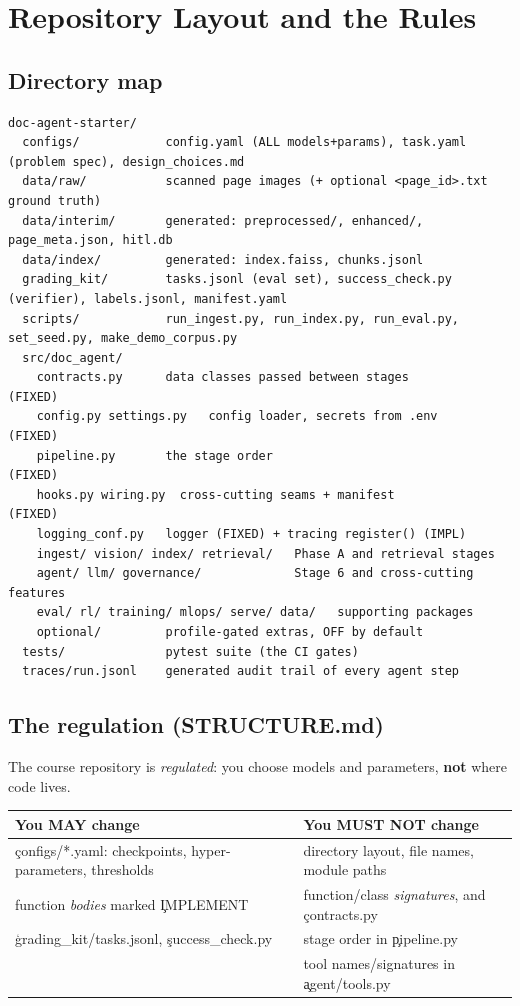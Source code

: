 \chapter{Repository Layout and the Rules}
\section{Directory map}
\begin{lstlisting}[style=plain]
doc-agent-starter/
  configs/            config.yaml (ALL models+params), task.yaml (problem spec), design_choices.md
  data/raw/           scanned page images (+ optional <page_id>.txt ground truth)
  data/interim/       generated: preprocessed/, enhanced/, page_meta.json, hitl.db
  data/index/         generated: index.faiss, chunks.jsonl
  grading_kit/        tasks.jsonl (eval set), success_check.py (verifier), labels.jsonl, manifest.yaml
  scripts/            run_ingest.py, run_index.py, run_eval.py, set_seed.py, make_demo_corpus.py
  src/doc_agent/
    contracts.py      data classes passed between stages            (FIXED)
    config.py settings.py   config loader, secrets from .env        (FIXED)
    pipeline.py       the stage order                               (FIXED)
    hooks.py wiring.py  cross-cutting seams + manifest              (FIXED)
    logging_conf.py   logger (FIXED) + tracing register() (IMPL)
    ingest/ vision/ index/ retrieval/   Phase A and retrieval stages
    agent/ llm/ governance/             Stage 6 and cross-cutting features
    eval/ rl/ training/ mlops/ serve/ data/   supporting packages
    optional/         profile-gated extras, OFF by default
  tests/              pytest suite (the CI gates)
  traces/run.jsonl    generated audit trail of every agent step
\end{lstlisting}

\section{The regulation (STRUCTURE.md)}
The course repository is \emph{regulated}: you choose models and parameters, \textbf{not} where code lives.
\begin{center}
\begin{tabular}{@{}p{6.5cm}p{8cm}@{}}
\toprule You MAY change & You MUST NOT change \\ \midrule
\c{configs/*.yaml}: checkpoints, hyper-parameters, thresholds & directory layout, file names, module paths \\
function \emph{bodies} marked \c{IMPLEMENT} & function/class \emph{signatures}, and \c{contracts.py} \\
\c{grading\_kit/tasks.jsonl}, \c{success\_check.py} & stage order in \c{pipeline.py} \\
 & tool names/signatures in \c{agent/tools.py} \\
\bottomrule\end{tabular}
\end{center}

